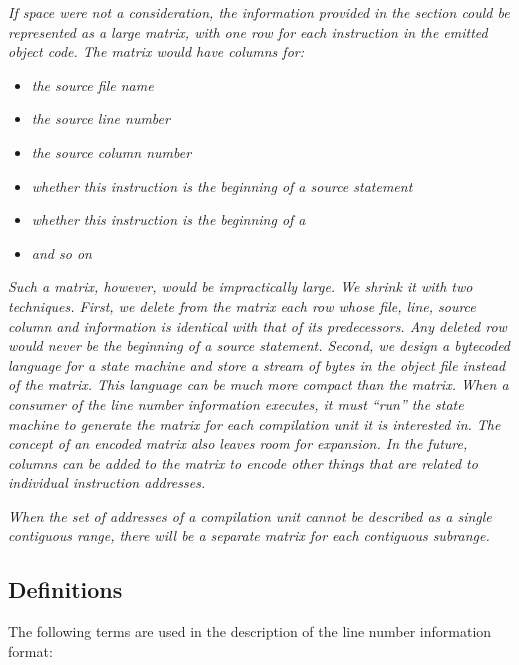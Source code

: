 \textit{If space were not a consideration, the information provided
in the  
section could be represented as a large
matrix, with one row for each instruction in the emitted
object code. The matrix would have columns for:}
\begin{itemize}
\item \textit{the source file name}
\item \textit{the source line number}
\item \textit{the source column number}
\item \textit{whether this instruction is the beginning of a source statement}
\item \textit{whether this instruction is the beginning of a }
\item \textit{and so on}
\end{itemize}
\textit{Such a matrix, however, would be impractically large. We
shrink it with two techniques. First, we delete from
the matrix each row whose file, line, source column and
 information 
is identical with that of its
predecessors. Any deleted row would never be the beginning of
a source statement. Second, we design a byte\dash coded language
for a state machine and store a stream of bytes in the object
file instead of the matrix. This language can be much more
compact than the matrix. When a consumer of the line number
information executes, it must ``run'' the state machine
to generate the matrix for each compilation unit it is
interested in.  The concept of an encoded matrix also leaves
room for expansion. In the future, columns can be added to the
matrix to encode other things that are related to individual
instruction addresses.}

\textit{When the set of addresses of a compilation unit cannot be
described as a single contiguous range, there will be a
separate matrix for each contiguous subrange.}

\subsection{Definitions}

The following terms are used in the description of the line
number information format:


